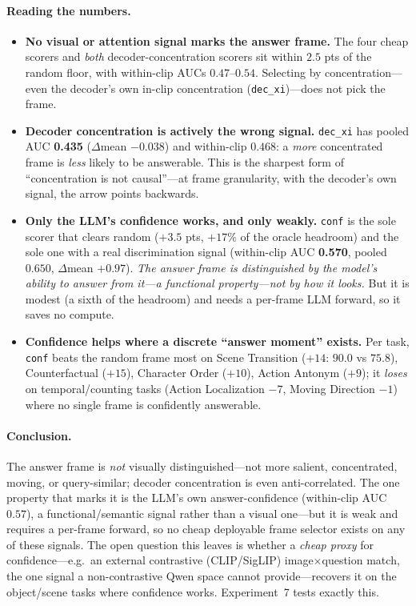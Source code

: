 \documentclass[11pt]{article}
\begin{document}
\paragraph{Reading the numbers.}
\begin{itemize}
\item \textbf{No visual or attention signal marks the answer frame.} The four cheap scorers
      and \emph{both} decoder-concentration scorers sit within $2.5$ pts of the random floor,
      with within-clip AUCs $0.47$--$0.54$. Selecting by concentration---even the decoder's
      own in-clip concentration (\texttt{dec\_xi})---does not pick the frame.
\item \textbf{Decoder concentration is actively the wrong signal.} \texttt{dec\_xi} has
      pooled AUC \textbf{0.435} ($\Delta$mean $-0.038$) and within-clip $0.468$: a
      \emph{more} concentrated frame is \emph{less} likely to be answerable. This is the
      sharpest form of ``concentration is not causal''---at frame granularity, with the
      decoder's own signal, the arrow points backwards.
\item \textbf{Only the LLM's confidence works, and only weakly.} \texttt{conf} is the sole
      scorer that clears random ($+3.5$ pts, $+17\%$ of the oracle headroom) and the sole one
      with a real discrimination signal (within-clip AUC \textbf{0.570}, pooled $0.650$,
      $\Delta$mean $+0.97$). \emph{The answer frame is distinguished by the model's ability to
      answer from it---a functional property---not by how it looks.} But it is modest (a sixth
      of the headroom) and needs a per-frame LLM forward, so it saves no compute.
\item \textbf{Confidence helps where a discrete ``answer moment'' exists.} Per task,
      \texttt{conf} beats the random frame most on Scene Transition ($+14$: $90.0$ vs $75.8$),
      Counterfactual ($+15$), Character Order ($+10$), Action Antonym ($+9$); it \emph{loses}
      on temporal/counting tasks (Action Localization $-7$, Moving Direction $-1$) where no
      single frame is confidently answerable.
\end{itemize}

\paragraph{Conclusion.} The answer frame is \emph{not} visually distinguished---not more
salient, concentrated, moving, or query-similar; decoder concentration is even
anti-correlated. The one property that marks it is the LLM's own answer-confidence
(within-clip AUC $0.57$), a functional/semantic signal rather than a visual one---but it is
weak and requires a per-frame forward, so no cheap deployable frame selector exists on any
of these signals. The open question this leaves is whether a \emph{cheap proxy} for
confidence---e.g.\ an external contrastive (CLIP/SigLIP) image$\times$question match, the one
signal a non-contrastive Qwen space cannot provide---recovers it on the object/scene tasks
where confidence works. Experiment~7 tests exactly this.
\end{document}
